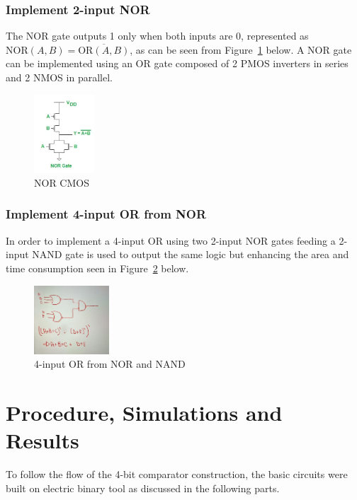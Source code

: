 \documentclass[conference]{IEEEtran}
\begin{document}
\subsubsection{Implement 2-input NOR}
The NOR gate outputs 1 only when both inputs are 0, represented as \( \text{NOR}(A, B) = \overline{\text{OR}(A, B)} \), as can be seen from Figure~\ref{fig:NORCMOS} below. A NOR gate can be implemented using an OR gate composed of 2 PMOS inverters in series and 2 NMOS in parallel.
\begin{figure}[h]
    \centering
    \includegraphics[width=0.2\textwidth]{assets/NORCMOS.png}
    \caption{NOR CMOS}
    \label{fig:NORCMOS}
\end{figure}

\subsubsection{Implement 4-input OR from NOR}
In order to implement a 4-input OR using two 2-input NOR gates feeding a 2-input NAND gate is used to output the same logic but enhancing the area and time consumption seen in Figure~\ref{fig:4inputORfromNORandNAND} below.
\begin{figure}[h]
    \centering
    \includegraphics[width=0.25\textwidth]{assets/4inputORfromNORandNAND.jpg}
    \caption{4-input OR from NOR and NAND}
    \label{fig:4inputORfromNORandNAND}
\end{figure}


\section{Procedure, Simulations and Results}
To follow the flow of the 4-bit comparator construction, the basic circuits were built on electric binary tool as discussed in the following parts.
\end{document}
